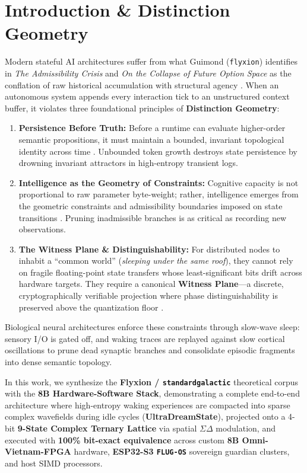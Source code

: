 \documentclass[10pt, twocolumn, a4paper]{article}
\begin{document}
\section{Introduction \& Distinction Geometry}

Modern stateful AI architectures suffer from what Guimond (\texttt{flyxion}) identifies in \textit{The Admissibility Crisis} and \textit{On the Collapse of Future Option Space} as the conflation of raw historical accumulation with structural agency \cite{guimond2026admissibility, guimond2026collapse}. When an autonomous system appends every interaction tick to an unstructured context buffer, it violates three foundational principles of \textbf{Distinction Geometry}:

\begin{enumerate}
    \item \textbf{Persistence Before Truth:} Before a runtime can evaluate higher-order semantic propositions, it must maintain a bounded, invariant topological identity across time \cite{guimond2026persistence}. Unbounded token growth destroys state persistence by drowning invariant attractors in high-entropy transient logs.
    \item \textbf{Intelligence as the Geometry of Constraints:} Cognitive capacity is not proportional to raw parameter byte-weight; rather, intelligence emerges from the geometric constraints and admissibility boundaries imposed on state transitions \cite{guimond2026constraints}. Pruning inadmissible branches is as critical as recording new observations.
    \item \textbf{The Witness Plane \& Distinguishability:} For distributed nodes to inhabit a ``common world'' (\textit{sleeping under the same roof}), they cannot rely on fragile floating-point state transfers whose least-significant bits drift across hardware targets. They require a canonical \textbf{Witness Plane}---a discrete, cryptographically verifiable projection where phase distinguishability is preserved above the quantization floor \cite{guimond2026witness, guimond2026wireheading}.
\end{enumerate}

Biological neural architectures enforce these constraints through slow-wave sleep: sensory I/O is gated off, and waking traces are replayed against slow cortical oscillations to prune dead synaptic branches and consolidate episodic fragments into dense semantic topology.

In this work, we synthesize the \textbf{Flyxion / \texttt{standardgalactic}} theoretical corpus with the \textbf{8B Hardware-Software Stack}, demonstrating a complete end-to-end architecture where high-entropy waking experiences are compacted into sparse complex wavefields during idle cycles (\textbf{UltraDreamState}), projected onto a 4-bit \textbf{9-State Complex Ternary Lattice} via spatial $\Sigma\Delta$ modulation, and executed with \textbf{100\% bit-exact equivalence} across custom \textbf{8B Omni-Vietnam-FPGA} hardware, \textbf{ESP32-S3 \texttt{FLUG-OS}} sovereign guardian clusters, and host SIMD processors.
\end{document}
